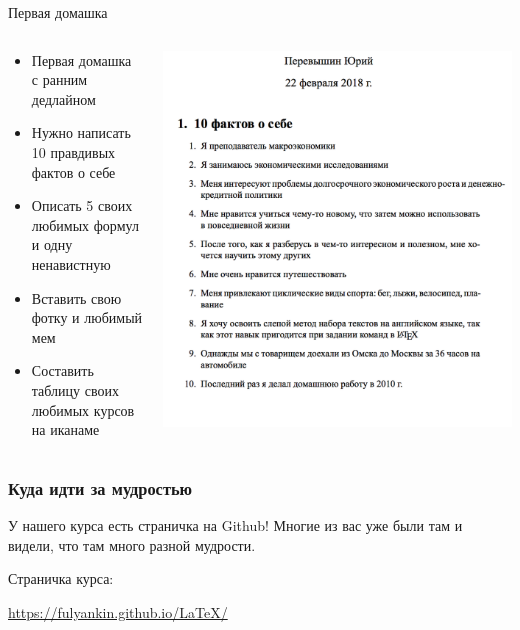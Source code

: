 \documentclass[aspectratio=169,newPxFont]{beamer}
\begin{document}
\begin{frame}{Первая домашка}
\begin{columns}
\begin{column}{.48\linewidth}
	\begin{itemize}
		\item  Первая домашка с ранним дедлайном
		\item  Нужно написать 10 правдивых фактов о себе
		\item  Описать 5 своих любимых формул и одну ненавистную
		\item  Вставить свою фотку и любимый мем
		\item  Составить таблицу своих любимых курсов на иканаме
	\end{itemize}
\end{column}	

	\begin{column}{.48\linewidth}
		\includegraphics[scale=0.18]{hw_per.png}
	\end{column}
\end{columns}
\end{frame}



\begin{frame}
\frametitle{Куда идти за мудростью}

У нашего курса есть страничка на Github! Многие из вас уже были там и видели, что там много разной мудрости.
\vspace{1cm}

\begin{block}{Страничка курса:}
\vspace{3mm}
\centerline {\url{https://fulyankin.github.io/LaTeX/}}
\vspace{3mm}
\end{block}
\end{frame}
\end{document}
